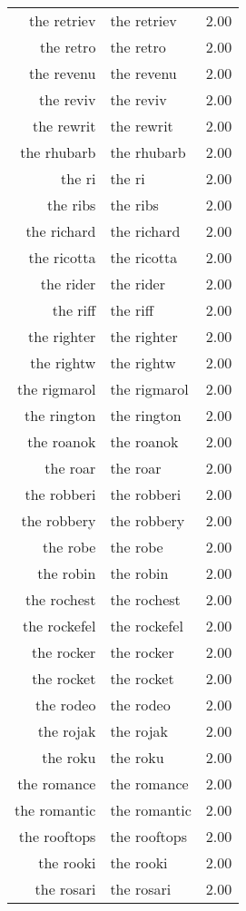 \begin{table}[ht]
\begin{tabular}{rlr}
  the retriev & the retriev & 2.00 \\ 
  the retro & the retro & 2.00 \\ 
  the revenu & the revenu & 2.00 \\ 
  the reviv & the reviv & 2.00 \\ 
  the rewrit & the rewrit & 2.00 \\ 
  the rhubarb & the rhubarb & 2.00 \\ 
  the ri & the ri & 2.00 \\ 
  the ribs & the ribs & 2.00 \\ 
  the richard & the richard & 2.00 \\ 
  the ricotta & the ricotta & 2.00 \\ 
  the rider & the rider & 2.00 \\ 
  the riff & the riff & 2.00 \\ 
  the righter & the righter & 2.00 \\ 
  the rightw & the rightw & 2.00 \\ 
  the rigmarol & the rigmarol & 2.00 \\ 
  the rington & the rington & 2.00 \\ 
  the roanok & the roanok & 2.00 \\ 
  the roar & the roar & 2.00 \\ 
  the robberi & the robberi & 2.00 \\ 
  the robbery & the robbery & 2.00 \\ 
  the robe & the robe & 2.00 \\ 
  the robin & the robin & 2.00 \\ 
  the rochest & the rochest & 2.00 \\ 
  the rockefel & the rockefel & 2.00 \\ 
  the rocker & the rocker & 2.00 \\ 
  the rocket & the rocket & 2.00 \\ 
  the rodeo & the rodeo & 2.00 \\ 
  the rojak & the rojak & 2.00 \\ 
  the roku & the roku & 2.00 \\ 
  the romance & the romance & 2.00 \\ 
  the romantic & the romantic & 2.00 \\ 
  the rooftops & the rooftops & 2.00 \\ 
  the rooki & the rooki & 2.00 \\ 
  the rosari & the rosari & 2.00 \\ 

\end{tabular}
\end{table}
